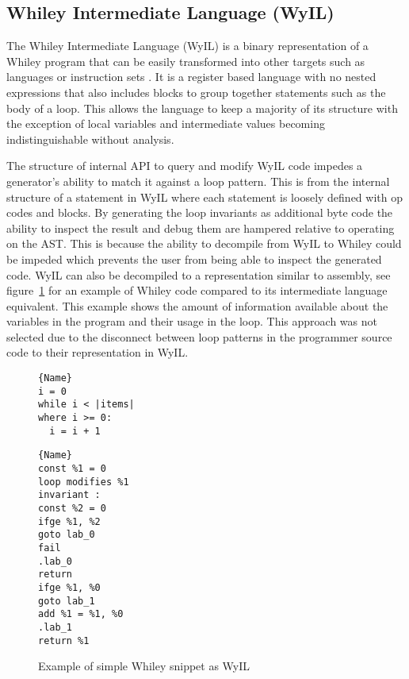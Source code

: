 \subsection{Whiley Intermediate Language (WyIL)}

The Whiley Intermediate Language (WyIL) is a binary representation of a Whiley program
that can be easily transformed into other targets such as languages or
instruction sets \cite{wyil}.
It is a register based language with no nested expressions
that also includes blocks to group together statements such as the body of a loop.
This allows the language to keep a majority of its structure with the
exception of local variables and intermediate values becoming indistinguishable
without analysis.

The structure of internal API to query and modify WyIL code impedes a
generator's ability to match it against a loop pattern.
This is from the internal structure of a statement in WyIL where each
statement is loosely defined with op codes and blocks.
By generating the loop invariants as additional byte code the ability to
inspect the result and debug them are hampered relative to operating on the
AST.  This is because the ability to decompile from WyIL to Whiley could
be impeded which prevents the user from being able to inspect the generated
code.
WyIL can also be decompiled to a representation similar to assembly, see
figure~\ref{lst:design-wyil} for an example of Whiley code compared to its
intermediate language equivalent.
This example shows the amount of information available about the variables
in the program and their usage in the loop.
This approach was not selected due to the disconnect between loop patterns
in the programmer source code to their representation in WyIL.


\begin{figure}
\noindent\begin{minipage}{.45\textwidth}
\begin{lstlisting}[caption={Whiley Code},frame=tlrb,numbers=none]{Name}
i = 0
while i < |items|
where i >= 0:
  i = i + 1
\end{lstlisting}
\end{minipage}\hfill
\begin{minipage}{.45\textwidth}
\begin{lstlisting}[caption={WyIL Code},frame=tlrb,numbers=none]{Name}
const %1 = 0
loop modifies %1
invariant :
const %2 = 0
ifge %1, %2
goto lab_0
fail
.lab_0
return
ifge %1, %0
goto lab_1
add %1 = %1, %0
.lab_1
return %1
\end{lstlisting}
\end{minipage}
\caption{Example of simple Whiley snippet as WyIL}
\label{lst:design-wyil}
\end{figure}

